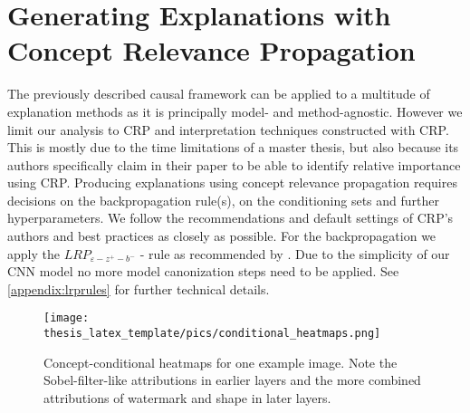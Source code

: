 \section{Generating Explanations with Concept Relevance Propagation}\label{section:explanations_with_crp}
The previously described causal framework can be applied to a multitude of explanation methods as it is principally model- and method-agnostic. However we limit our analysis to CRP and interpretation techniques constructed with CRP. This is mostly due to the time limitations of a master thesis, but also because its authors specifically claim in their paper to be able to identify relative importance using CRP. 
Producing explanations using concept relevance propagation requires decisions on the backpropagation rule(s), on the conditioning sets and further hyperparameters. 
We follow the recommendations and default settings of CRP's authors \cite{Achtibat2022, Achtibat2023} and best practices \cite{Kohlbrenner2020} as closely as possible.
For the backpropagation we apply the $LRP_{\varepsilon -z^+- b^-}$ - rule as recommended by \cite{Kohlbrenner2020}. Due to the simplicity of our CNN model no more model canonization steps need to be applied. See \cref{appendix:lrprules} for further technical details. 

\begin{figure}[t!]
    \centering
    \texttt{[image: thesis\_latex\_template/pics/conditional\_heatmaps.png]}
    \caption[Comparing Attribution Maps of Layers]{Concept-conditional heatmaps for one example image. Note the Sobel-filter-like attributions in earlier layers and the more combined attributions of watermark and shape in later layers.}
    \label{fig:cc_heatmaps}
\end{figure}



